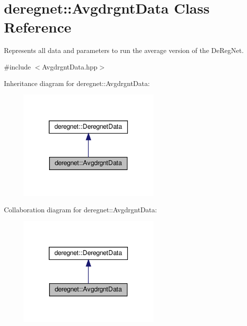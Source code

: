 \hypertarget{classderegnet_1_1AvgdrgntData}{}\section{deregnet\+:\+:Avgdrgnt\+Data Class Reference}
\label{classderegnet_1_1AvgdrgntData}


Represents all data and parameters to run the average version of the De\+Reg\+Net.  




{\ttfamily \#include $<$Avgdrgnt\+Data.\+hpp$>$}



Inheritance diagram for deregnet\+:\+:Avgdrgnt\+Data\+:\nopagebreak
\begin{figure}[H]
\begin{center}
\leavevmode
\includegraphics[width=201pt]{classderegnet_1_1AvgdrgntData__inherit__graph}
\end{center}
\end{figure}


Collaboration diagram for deregnet\+:\+:Avgdrgnt\+Data\+:\nopagebreak
\begin{figure}[H]
\begin{center}
\leavevmode
\includegraphics[width=201pt]{classderegnet_1_1AvgdrgntData__coll__graph}
\end{center}
\end{figure}
